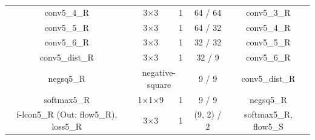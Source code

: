 \documentclass[10pt,twocolumn,letterpaper]{article}
\begin{document}
\begin{table}[t]
{\begin{tabular}{ccccc}
\multicolumn{1}{|c||}{conv5\_4\_R}			
&\multicolumn{1}{c|}{3$\times$3}
&\multicolumn{1}{c|}{1}
&\multicolumn{1}{c|}{64 / 64}
&\multicolumn{1}{c|}{conv5\_3\_R} \\	
	
\multicolumn{1}{|c||}{conv5\_5\_R}			
&\multicolumn{1}{c|}{3$\times$3}
&\multicolumn{1}{c|}{1}
&\multicolumn{1}{c|}{64 / 32}
&\multicolumn{1}{c|}{conv5\_4\_R} \\	
	
\multicolumn{1}{|c||}{conv5\_6\_R}			
&\multicolumn{1}{c|}{3$\times$3}
&\multicolumn{1}{c|}{1}
&\multicolumn{1}{c|}{32 / 32}
&\multicolumn{1}{c|}{conv5\_5\_R} \\	

\multicolumn{1}{|c||}{conv5\_dist\_R}			
&\multicolumn{1}{c|}{3$\times$3}
&\multicolumn{1}{c|}{1}
&\multicolumn{1}{c|}{32 / 9}
&\multicolumn{1}{c|}{conv5\_6\_R} \\

\multicolumn{1}{|c||}{negsq5\_R}			
&\multicolumn{2}{c|}{negative-square}
&\multicolumn{1}{c|}{9 / 9}
&\multicolumn{1}{c|}{conv5\_dist\_R} \\

\multicolumn{1}{|c||}{softmax5\_R}			
&\multicolumn{1}{c|}{1$\times$1$\times$9}
&\multicolumn{1}{c|}{1}
&\multicolumn{1}{c|}{9 / 9}
&\multicolumn{1}{c|}{negsq5\_R} \\

\multicolumn{1}{|c||}{f-lcon5\_R (Out: flow5\_R), loss5\_R}			
&\multicolumn{1}{c|}{3$\times$3}
&\multicolumn{1}{c|}{1}
&\multicolumn{1}{c|}{(9, 2) / 2}
&\multicolumn{1}{c|}{softmax5\_R, flow5\_S} \\					 
\hline
\end{tabular}}
\end{table}
%
{\small


}
\end{document}
